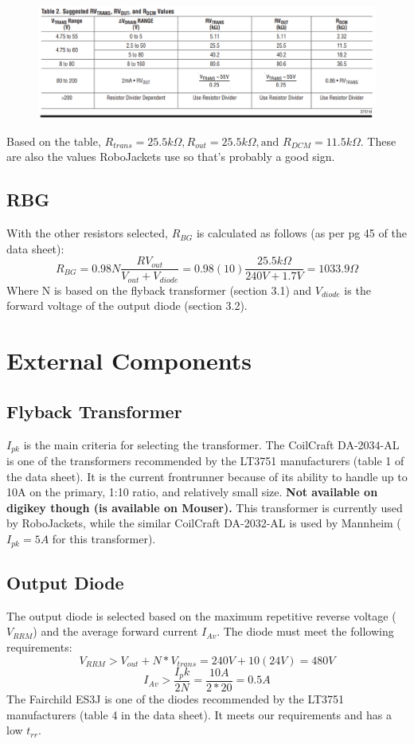 \documentclass{article}
\begin{document}
	\begin{figure}[h!]
		\includegraphics[width=\linewidth]{LT3571_Resistor_Values.png}
	\end{figure}

	\noindent Based on the table, $R_{trans} = 25.5k\Omega, R_{out} = 25.5k\Omega, \text{and } R_{DCM} = 11.5k\Omega$. These are also the values RoboJackets use so that's probably a good sign.

	\subsection{RBG}
	With the other resistors selected, $R_{BG}$ is calculated as follows (as per pg 45 of the data sheet):
	\[R_{BG} = 0.98N\dfrac{RV_{out}}{V_{out} + V_{diode}} = 0.98(10)\dfrac{25.5k\Omega}{240V + 1.7V} = 1033.9\Omega\]
	Where N is based on the flyback transformer (section 3.1) and $V_{diode}$ is the forward voltage of the output diode (section 3.2).
	
	\section{External Components}
	\subsection{Flyback Transformer}
	$I_{pk}$ is the main criteria for selecting the transformer. The CoilCraft DA-2034-AL is one of the transformers recommended by the LT3751 manufacturers (table 1 of the data sheet). It is the current frontrunner because of its ability to handle up to 10A on the primary, 1:10 ratio, and relatively small size. \textbf{Not available on digikey though (is available on Mouser).} This transformer is currently used by RoboJackets, while the similar CoilCraft DA-2032-AL is used by Mannheim ($I_{pk} = 5A$ for this transformer).
	\subsection{Output Diode}
	The output diode is selected based on the maximum repetitive reverse voltage ($V_{RRM}$) and the average forward current $I_{Av}$. The diode must meet the following requirements:
	\[V_{RRM} > V_{out} + N*V_{trans} = 240V + 10(24V)  = 480V\]
	\[I_{Av} > \dfrac{I_pk}{2N} = \dfrac{10A}{2*20} = 0.5A\]  
	The Fairchild ES3J is one of the diodes recommended by the LT3751 manufacturers (table 4 in the data sheet). It meets our requirements and has a low $t_{rr}$.
\end{document}

